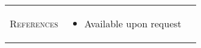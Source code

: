 \documentclass[11pt]{article}
\newcommand{\cellone}{3.5cm} %
\newcommand{\celltwo}{11cm}
\newcommand{\cellthree}{4cm}
\begin{document}
\begin{tabularx}{\textwidth}{p{\cellone} p{\celltwo} p{\cellthree}}
  \parbox[t][0cm]{\cellone}{R\textsc{eferences}} & \parbox[t][0cm]{6cm}{
    \vspace{-0.65cm}
    
    \begin{itemize}
      \item Available upon request
    \end{itemize}
  }
  
\end{tabularx}
\end{document}

